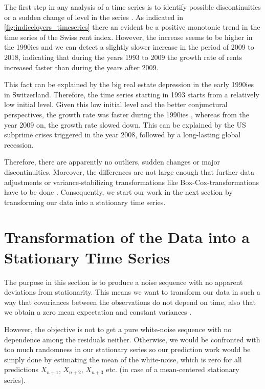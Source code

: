\documentclass[11pt,a4paper]{article}
\begin{document}
The first step in any analysis of a time series is to identify possible discontinuities or a sudden change of level in the series \cite[p.~23]{bd02}.
As indicated in \cref{fig:indiceloyers_timeseries} there an evident be a positive monotonic trend in the time series of the Swiss rent index.
However, the increase seems to be higher in the 1990ies and we can detect a slightly slower increase in the period of 2009 to 2018, indicating that during the years 1993 to 2009 the growth rate of rents increased faster than during the years after 2009.

This fact can be explained by the big real estate depression in the early 1990ies in Switzerland. Therefore, the time series starting in 1993 starts from a relatively low initial level. Given this low initial level and the better conjunctural perspectives, the growth rate was faster during the 1990ies \citep{fuw}, whereas from the year 2009 on, the growth rate slowed down. This can be explained by the US subprime crises triggered in the year 2008, followed by a long-lasting global recession.

Therefore, there are apparently no outliers, sudden changes or major discontinuities. Moreover, the differences are not large enough that further data adjustments or variance-stabilizing transformations like Box-Cox-transformations have to be done \citep{boxcox64}.
Consequently, we start our work in the next section by transforming our data into a stationary time series.



\section{Transformation of the Data into a Stationary Time Series}

The purpose in this section is to produce a noise sequence with no apparent deviations from stationarity. This means we want to transform our data in such a way that covariances between the observations do not depend on time, also that we obtain a zero mean expectation and constant variances \cite[pp.~14--23]{bd02}.

However, the objective is not to get a pure white-noise sequence with no dependence among the residuals neither. Otherwise, we would be confronted with too much randomness in our stationary series so our prediction work would be simply done by estimating the mean of the white-noise, which is zero for all predictions $X_{n+1}$, $X_{n+2}$, $X_{n+3}$ etc. (in case of a mean-centered stationary series).
\end{document}
